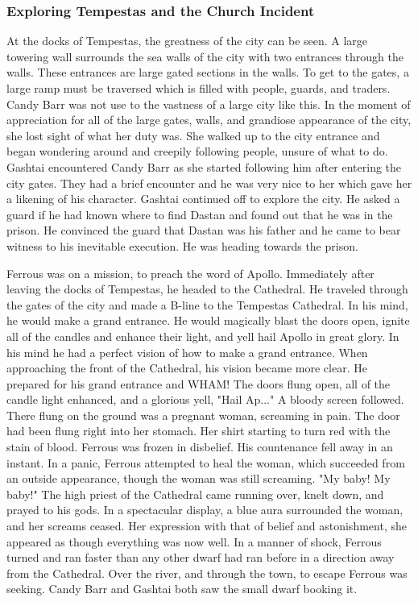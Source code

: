 \subsubsection{Exploring Tempestas and the Church Incident}

At the docks of Tempestas, the greatness of the city can be seen. A large towering wall surrounds the sea walls of the city with two entrances through the walls. These entrances are large gated sections in the walls. To get to the gates, a large ramp must be traversed which is filled with people, guards, and traders. Candy Barr was not use to the vastness of a large city like this. In the moment of appreciation for all of the large gates, walls, and grandiose appearance of the city, she lost sight of what her duty was. She walked up to the city entrance and began wondering around and creepily following people, unsure of what to do. Gashtai encountered Candy Barr as she started following him after entering the city gates. They had a brief encounter and he was very nice to her which gave her a likening of his character. Gashtai continued off to explore the city. He asked a guard if he had known where to find Dastan and found out that he was in the prison. He convinced the guard that Dastan was his father and he came to bear witness to his inevitable execution. He was heading towards the prison.

Ferrous was on a mission, to preach the word of Apollo. Immediately after leaving the docks of Tempestas, he headed to the Cathedral. He traveled through the gates of the city and made a B-line to the Tempestas Cathedral. In his mind, he would make a grand entrance. He would magically blast the doors open, ignite all of the candles and enhance their light, and yell hail Apollo in great glory. In his mind he had a perfect vision of how to make a grand entrance. When approaching the front of the Cathedral, his vision became more clear. He prepared for his grand entrance and WHAM! The doors flung open, all of the candle light enhanced, and a glorious yell, "Hail Ap..." A bloody screen followed. There flung on the ground was a pregnant woman, screaming in pain. The door had been flung right into her stomach. Her shirt starting to turn red with the stain of blood. Ferrous was frozen in disbelief. His countenance fell away in an instant. In a panic, Ferrous attempted to heal the woman, which succeeded from an outside appearance, though the woman was still screaming. "My baby! My baby!" The high priest of the Cathedral came running over, knelt down, and prayed to his gods. In a spectacular display, a blue aura surrounded the woman, and her screams ceased. Her expression with that of belief and astonishment, she appeared as though everything was now well. In a manner of shock, Ferrous turned and ran faster than any other dwarf had ran before in a direction away from the Cathedral. Over the river, and through the town, to escape Ferrous was seeking. Candy Barr and Gashtai both saw the small dwarf booking it.


